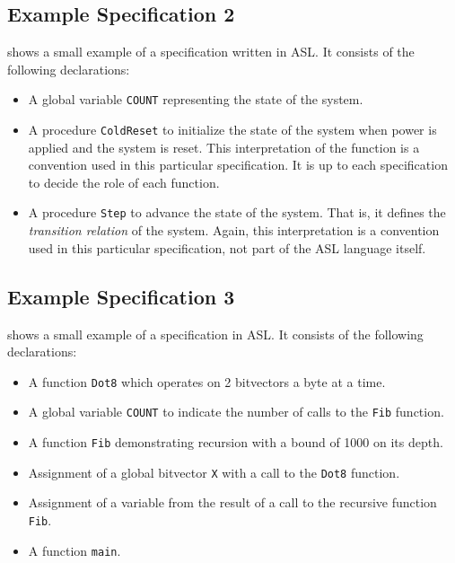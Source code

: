 \subsection{Example Specification 2}
 shows a small example of a specification written in ASL. It consists of the following declarations:
\begin{itemize}
\item A global variable \texttt{COUNT} representing the state of the system.
\item A procedure \texttt{ColdReset} to initialize the state of the system when power is applied and the system is reset.
    This interpretation of the function is a convention used in this particular specification. It is up to each
    specification to decide the role of each function.
\item A procedure \texttt{Step} to advance the state of the system. That is, it defines the \emph{transition relation} of the system.
    Again, this interpretation is a convention used in this particular specification, not part of the ASL language
    itself.
\end{itemize}

\begin{center}

\end{center}

\subsection{Example Specification 3}
 shows a small example of a specification in ASL. It consists of the following declarations:
\begin{itemize}
    \item A function \texttt{Dot8} which operates on 2 bitvectors a byte at a time.
    \item A global variable \texttt{COUNT} to indicate the number of calls to the \texttt{Fib} function.
    \item A function \texttt{Fib} demonstrating recursion with a bound of 1000 on its depth.
    \item Assignment of a global bitvector \texttt{X} with a call to the \texttt{Dot8} function.
    \item Assignment of a variable from the result of a call to the recursive function \texttt{Fib}.
    \item A function \texttt{main}.
\end{itemize}

